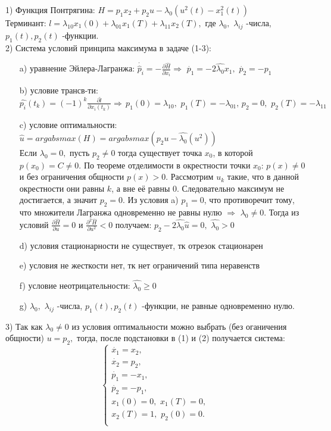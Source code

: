 \documentclass{article}
\theoremstyle{remark}
\theoremstyle{definition}
\begin{document}
1) Функция Понтрягина: $H=p_1x_2+p_2u-\lambda_0(u^2(t)-x_1^2(t))$\\
Терминант: $l=\lambda_{10}x_1(0)+\lambda_{01}x_1(T)+\lambda_{11}x_2(T),$ где $\lambda_0,\,\,\lambda_{ij}$ -числа, $p_1(t),p_2(t)$ -функции.\\
2) Система условий принципа максимума в задаче (1-3):\\
\begin{itemize}
    \item[a)] уравнение Эйлера-Лагранжа:
    $\dot{\widehat p_i}=-\frac{\partial\widehat{H}}{\partial x_i}\Rightarrow\,\,\dot{p_1}=-2\widehat{\lambda_0}x_1,\,\,\dot{p_2}=-p_1$    \item[b)] условие трансв-ти:
    $\widehat{p_i}(t_k)=(-1)^k\frac{\partial\widehat{l}}{\partial x_i(t_k)}\Rightarrow\,p_1(0)=\lambda_{10},\,\,p_1(T)=-\lambda_{01},\,p_2=0,\,\,p_2(T)=-\lambda_{11}$
    \item[c)] условие оптимальности:
    $\widehat{u}=argabsmax(H)=argabsmax\left(p_2u-\widehat{\lambda_0}(u^2)\right)$\\
    Если $\lambda_0=0,$ пусть $p_2\neq 0$ тогда существует точка $x_0$, в которой $p(x_0)=C\neq0$. По теореме отделимости в окрестности точки $x_0$: $p(x)\neq0$ и без ограничения общности $p(x)>0$. Рассмотрим $u_k$ такие, что в данной окрестности они равны $k$, а вне её равны $0$. Следовательно максимум не достигается, а значит $p_2=0$. Из условия a) $p_1=0$, что противоречит тому, что множители Лагранжа одновременно не равны нулю $\Rightarrow\,\, \lambda_0\neq 0$. Тогда из условий
    $\frac{\partial\widehat{H}}{\partial u}=0$ и $\frac{\partial^2\widehat{H}}{\partial u^2}<0$ получаем: $p_2-2\widehat{\lambda_0}\widehat{u}=0,\,\,\widehat{\lambda_0}>0$
    \item[d)] условия стационарности не существует, тк отрезок стационарен
    \item[e)] условия не жесткости нет, тк нет ограничений типа неравенств
    \item[f)] условие неотрицательности: $\widehat{\lambda_0}\geq 0$
    \item[g)] $\lambda_0,\,\,\lambda_{ij}$ -числа, $p_1(t),p_2(t)$ -функции, не равные одновременно нулю.
    \end{itemize}
3) Так как $\lambda_0\neq 0$ из условия оптимальности можно выбрать (без оганичения общности) $u=p_2,$ тогда, после подстановки в (1) и (2) получается система:
$$
\begin{cases}
  \dot{x_1}=x_2,\\
  \dot{x_2}=p_2,\\
  \dot{p_1}=-x_1,\\
  \dot{p_2}=-p_1,\\
  x_1(0)=0,\,\,x_1(T)=0,\\
  x_2(T)=1,\,\,p_2(0)=0.\\
 \end{cases} $$
\end{document}
